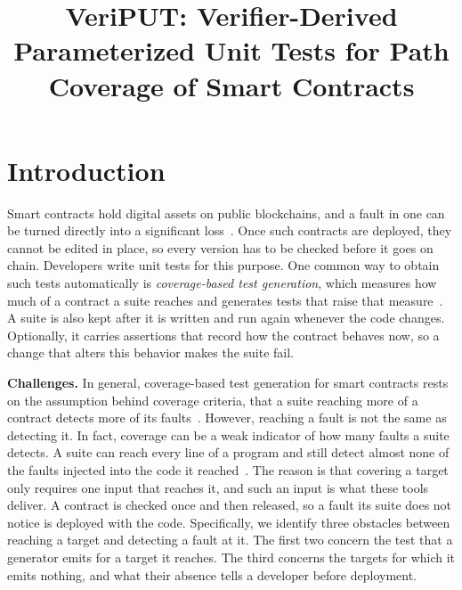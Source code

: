 \documentclass[manuscript,anonymous]{acmart}
\begin{document}
\title{VeriPUT: Verifier-Derived Parameterized Unit Tests for Path Coverage of
Smart Contracts}
\begin{abstract}
\end{abstract}
\maketitle

\section{Introduction}\label{sec:intro}

Smart contracts hold digital assets on public blockchains, and a fault in one
can be turned directly into a significant loss~\cite{werner2022sok}. Once such
contracts are deployed, they cannot be edited in place, so every version has to
be checked before it goes on chain. Developers write unit tests for this
purpose. One common way to obtain such tests automatically is \emph{coverage-based
test generation}, which measures how much of a contract a suite reaches and
generates tests that raise that
measure~\cite{syntest_solidity,solar_sbst,SolTG-1}. A suite is also kept after
it is written and run again whenever the code changes. Optionally, it carries assertions that record how the contract behaves
now, so a change that alters this behavior makes the suite fail.

\textbf{Challenges.} In general, coverage-based test generation for smart
contracts rests on the assumption behind coverage criteria, that a suite
reaching more of a contract detects more of its faults~\cite{AmmannOffutt}.
However, reaching a fault is not the same as detecting it. In fact, coverage can
be a weak indicator of how many faults a suite detects. A suite can reach every
line of a program and still detect almost none of the faults injected into the
code it reached~\cite{Wang2025MutationGuided}. The reason is that covering a
target only requires one input that reaches it, and such an input is what these
tools deliver. A contract is checked once and then released, so a fault its
suite does not notice is deployed with the code. Specifically, we identify three
obstacles between reaching a target and detecting a fault at it. The first two
concern the test that a generator emits for a target it reaches. The third
concerns the targets for which it emits nothing, and what their absence tells a
developer before deployment.
\end{document}

